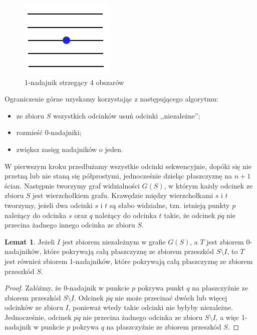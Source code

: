 \documentclass[brudnopis]{xmgr}
\theoremstyle{definition}
\newtheorem{Lemat}{Lemat}
\begin{document}
\begin{figure}[ht!]
  \centering
  \includegraphics{rysunki/k_nadajniki_ogr_dolne.png}
  \caption{1-nadajnik strzegący 4 obszarów}
  \label{fig:ogr_dolne}
\end{figure} 

Ograniczenie górne uzyskamy korzystając z następującego algorytmu:
\begin{itemize}
  \item ze zbioru $S$ wszystkich odcinków usuń odcinki ,,niezależne'';
  \item rozmieść 0-nadajniki;
  \item zwiększ zasięg nadajników o jeden.
\end{itemize}

W pierwszym kroku przedłużamy wszystkie odcinki sekwencyjnie, dopóki się nie przetną lub nie staną się półprostymi, jednocześnie dzieląc płaszczyznę na $n + 1$ ścian. Następnie tworzymy graf widzialności $G(S)$, w którym każdy odcinek ze zbioru $S$ jest wierzchołkiem grafu. Krawędzie między wierzchołkami $s$ i $t$ tworzymy, jeżeli dwa odcinki $s$ i $t$ są słabo widzialne, tzn. istnieją punkty $p$ należący do odcinka $s$ oraz $q$ należący do odcinka $t$ takie, że odcinek $\overline{pq}$ nie przecina żadnego innego odcinka ze zbioru $S$.

\begin{Lemat}\label{0-1-nadajniki} \cite{knadajniki}
  Jeżeli $I$ jest zbiorem niezależnym w grafie $G(S)$, a $T$ jest zbiorem $0$-nadajników, które pokrywają całą płaszczyznę ze zbiorem przeszkód $S \setminus I$, to $T$ jest również zbiorem 1-nadajników, które pokrywają całą płaszczyznę ze zbiorem przeszkód $S$.
\end{Lemat}

\begin{proof}
  Załóżmy, że 0-nadajnik w punkcie $p$ pokrywa punkt $q$ na płaszczyźnie ze zbiorem przeszkód $S \setminus I$. Odcinek $\overline{pq}$ nie może przecinać dwóch lub więcej odcinków ze zbioru $I$, ponieważ wtedy takie odcinki nie byłyby niezależne. Jednocześnie, odcinek $\overline{pq}$ nie przecina żadnego odcinka ze zbioru $S \setminus I$, a więc 1-nadajnik w punkcie $p$ pokrywa $q$ na płaszczyźnie ze zbiorem przeszkód $S$.
\end{proof}
\end{document}
